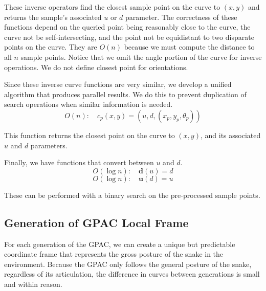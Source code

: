 These inverse operators find the closest sample point on the curve to $(x,y)$ and returns the sample's associated $u$ or $d$ parameter.  The correctness of these functions depend on the queried point being reasonably close to the curve, the curve not be self-intersecting, and the point not be equidistant to two disparate points on the curve.  They are $O(n)$ because we must compute the distance to all $n$ sample points.  Notice that we omit the angle portion of the curve for inverse operations.  We do not define closest point for orientations.

Since these inverse curve functions are very similar, we develop a unified algorithm that produces parallel results.  We do this to prevent duplication of search operations when similar information is needed.
\begin{equation}
O(n): \quad c_p(x,y) = (u, d, (x_p, y_p, \theta_p) )
\end{equation}

This function returns the closest point on the curve to $(x,y)$, and its associated $u$ and $d$ parameters.

Finally, we have functions that convert between $u$ and $d$.
\begin{equation}
O(\log n): \quad \mathbf{d}(u) = d
\end{equation}
\begin{equation}
O(\log n): \quad \mathbf{u}(d) = u
\end{equation}

These can be performed with a binary search on the pre-processed sample points.


\subsection{Generation of GPAC Local Frame}



For each generation of the GPAC, we can create a unique but predictable coordinate frame that represents the gross posture of the snake in the environment.  Because the GPAC only follows the general posture of the snake, regardless of its articulation, the difference in curves between generations is small and within reason.

